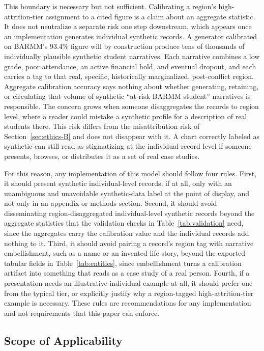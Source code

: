 \documentclass[11pt]{article}
\begin{document}
This boundary is necessary but not sufficient. Calibrating a region's high-attrition-tier assignment to a cited figure is a claim about an aggregate statistic. It does not neutralize a separate risk one step downstream, which appears once an implementation generates individual synthetic records. A generator calibrated on BARMM's 93.4\% figure will by construction produce tens of thousands of individually plausible synthetic student narratives. Each narrative combines a low grade, poor attendance, an active financial hold, and eventual dropout, and each carries a tag to that real, specific, historically marginalized, post-conflict region. Aggregate calibration accuracy says nothing about whether generating, retaining, or circulating that volume of synthetic ``at-risk BARMM student'' narratives is responsible. The concern grows when someone disaggregates the records to region level, where a reader could mistake a synthetic profile for a description of real students there. This risk differs from the misattribution risk of Section~\ref{sec:ethics-B} and does not disappear with it. A chart correctly labeled as synthetic can still read as stigmatizing at the individual-record level if someone presents, browses, or distributes it as a set of real case studies.

For this reason, any implementation of this model should follow four rules. First, it should present synthetic individual-level records, if at all, only with an unambiguous and unavoidable synthetic-data label at the point of display, and not only in an appendix or methods section. Second, it should avoid disseminating region-disaggregated individual-level synthetic records beyond the aggregate statistics that the validation checks in Table~\ref{tab:validation} need, since the aggregates carry the calibration value and the individual records add nothing to it. Third, it should avoid pairing a record's region tag with narrative embellishment, such as a name or an invented life story, beyond the exported tabular fields in Table~\ref{tab:entities}, since embellishment turns a calibration artifact into something that reads as a case study of a real person. Fourth, if a presentation needs an illustrative individual example at all, it should prefer one from the typical tier, or explicitly justify why a region-tagged high-attrition-tier example is necessary. These rules are recommendations for any implementation and not requirements that this paper can enforce.

\subsection{Scope of Applicability}
\label{sec:ethics-D}
\end{document}
